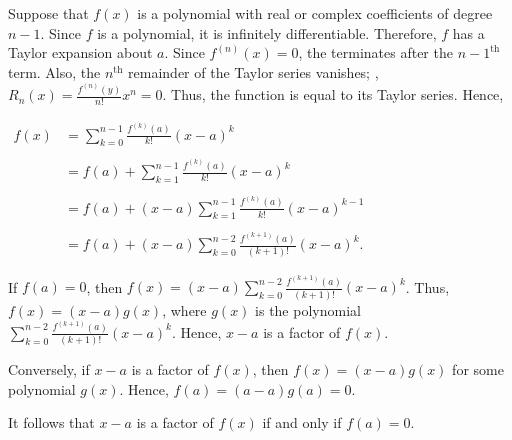 \documentclass[12pt]{article}
\begin{document}
Suppose that $f(x)$ is a polynomial with real or complex coefficients of degree $n-1$. Since $f$ is a polynomial, it is infinitely differentiable.  Therefore, $f$ has a Taylor expansion about $a$. Since $f^{(n)}(x)=0$, the  terminates after the $n-1^{\text{th}}$ term. Also, the $n^{\text{th}}$ remainder of the Taylor series vanishes; , $\displaystyle R_n(x)=\frac{f^{(n)}(y)}{n!}x^n=0$.  Thus, the function is equal to its Taylor series.  Hence,

\begin{center}
$\begin{array}{rl}
f(x) & \displaystyle =\sum_{k=0}^{n-1}\frac{f^{(k)}(a)}{k!}(x-a)^k \\
& \\
& \displaystyle =f(a)+\sum_{k=1}^{n-1}\frac{f^{(k)}(a)}{k!}(x-a)^k \\
& \\
& \displaystyle =f(a)+(x-a)\sum_{k=1}^{n-1}\frac{f^{(k)}(a)}{k!}(x-a)^{k-1} \\
& \\
& \displaystyle =f(a)+(x-a)\sum_{k=0}^{n-2}\frac{f^{(k+1)}(a)}{(k+1)!}(x-a)^k. \end{array}$
\end{center}

If $f(a)=0$, then $\displaystyle f(x)=(x-a)\sum_{k=0}^{n-2}\frac{f^{(k+1)}(a)}{(k+1)!}(x-a)^k$.  Thus, $f(x)=(x-a)g(x)$, where $g(x)$ is the polynomial $\displaystyle \sum_{k=0}^{n-2}\frac{f^{(k+1)}(a)}{(k+1)!}(x-a)^k$. Hence, $x-a$ is a factor of $f(x)$.

Conversely, if $x-a$ is a factor of $f(x)$, then $f(x)=(x-a)g(x)$ for some polynomial $g(x)$.  Hence, $f(a)=(a-a)g(a)=0$.

It follows that $x-a$ is a factor of $f(x)$ if and only if $f(a)=0$.
\end{document}
